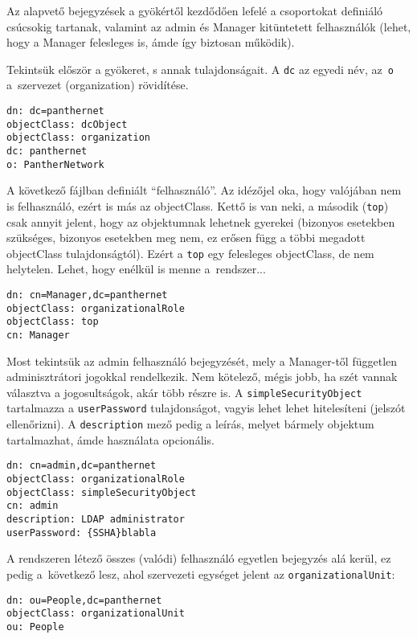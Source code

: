 Az alapvető bejegyzések a gyökértől kezdődően lefelé a csoportokat definiáló csúcsokig tartanak, valamint az admin és
Manager kitüntetett felhasználók (lehet, hogy a Manager felesleges is, ámde így biztosan működik).

Tekintsük először a gyökeret, s annak tulajdonságait.
A \texttt{dc} az egyedi név, az~\texttt{o} a~szervezet (organization) rövidítése.

\begin{Verbatim}[frame=single]
dn: dc=panthernet
objectClass: dcObject
objectClass: organization
dc: panthernet
o: PantherNetwork  
\end{Verbatim}


\noindent A következő  fájlban definiált ``felhasználó''. Az idézőjel oka, hogy valójában nem is
felhasználó, ezért is más az objectClass. Kettő is van neki, a második (\texttt{top}) csak annyit jelent, hogy az
objektumnak lehetnek gyerekei (bizonyos esetekben szükséges, bizonyos esetekben meg nem, ez erősen függ a többi megadott
objectClass tulajdonságtól). Ezért a \texttt{top} egy felesleges objectClass, de nem helytelen. Lehet, hogy enélkül is
menne a~rendszer...


\begin{Verbatim}[frame=single]
dn: cn=Manager,dc=panthernet
objectClass: organizationalRole
objectClass: top
cn: Manager
\end{Verbatim}

\noindent Most tekintsük az admin felhasználó bejegyzését, mely a Manager-től független adminisztrátori jogokkal
rendelkezik. Nem kötelező, mégis jobb, ha szét vannak választva a jogosultságok, akár több részre is. A
\texttt{simpleSecurityObject} tartalmazza a \texttt{userPassword} tulajdonságot, vagyis lehet lehet hitelesíteni
(jelszót ellenőrizni). A \texttt{description} mező pedig a leírás, melyet bármely objektum tartalmazhat, ámde használata
opcionális.


\begin{Verbatim}[frame=single]
dn: cn=admin,dc=panthernet
objectClass: organizationalRole
objectClass: simpleSecurityObject
cn: admin
description: LDAP administrator
userPassword: {SSHA}blabla
\end{Verbatim}


\noindent A rendszeren létező összes (valódi) felhasználó egyetlen bejegyzés alá kerül, ez pedig a~következő lesz, ahol
szervezeti egységet jelent az \texttt{organizationalUnit}:

\begin{Verbatim}[frame=single]
dn: ou=People,dc=panthernet
objectClass: organizationalUnit
ou: People  
\end{Verbatim}


